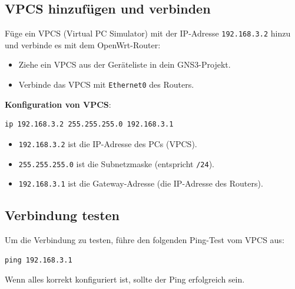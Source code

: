 \documentclass[12pt, a4paper]{article}\usepackage{listings}
\begin{document}
\subsection{VPCS hinzufügen und verbinden}

Füge ein VPCS (Virtual PC Simulator) mit der IP-Adresse \texttt{192.168.3.2} hinzu und verbinde es mit dem OpenWrt-Router:

\begin{itemize}
    \item Ziehe ein VPCS aus der Geräteliste in dein GNS3-Projekt.
    \item Verbinde das VPCS mit \texttt{Ethernet0} des Routers.
\end{itemize}

\textbf{Konfiguration von VPCS}:

\begin{verbatim}
ip 192.168.3.2 255.255.255.0 192.168.3.1
\end{verbatim}

\begin{itemize}
    \item \texttt{192.168.3.2} ist die IP-Adresse des PCs (VPCS).
    \item \texttt{255.255.255.0} ist die Subnetzmaske (entspricht \texttt{/24}).
    \item \texttt{192.168.3.1} ist die Gateway-Adresse (die IP-Adresse des Routers).
\end{itemize}

\subsection{Verbindung testen}

Um die Verbindung zu testen, führe den folgenden Ping-Test vom VPCS aus:

\begin{verbatim}
ping 192.168.3.1
\end{verbatim}

Wenn alles korrekt konfiguriert ist, sollte der Ping erfolgreich sein.
\end{document}
